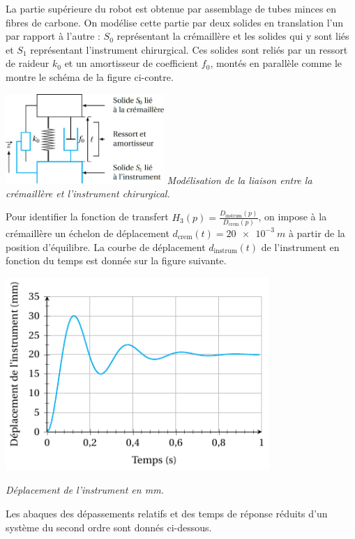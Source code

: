 \documentclass[10pt,fleqn]{article} %
\begin{document}
\noindent\begin{minipage}[c]{.6\linewidth}
La partie supérieure du robot est obtenue par assemblage de tubes minces en fibres de carbone. On modélise cette partie par deux solides en translation l'un par rapport à l'autre : $S_0$ représentant la crémaillère et les solides qui y sont liés et $S_1$ représentant l'instrument chirurgical. Ces solides sont reliés par un ressort de raideur $k_0$ et un amortisseur de coefficient $f_0$, montés en parallèle comme le montre le schéma de la figure ci-contre.%
\end{minipage}\hfill
\begin{minipage}[c]{.36\linewidth}
\begin{center}
	\includegraphics[width=6cm]{images2/schema_1}
\textit{Modélisation de la liaison entre la crémaillère et l'instrument chirurgical.\label{p04_robot_endo:fig6}}
\end{center}
\end{minipage}

Pour identifier la fonction de transfert $H_3(p)=\frac{D_{\text{instrum}}(p)}{D_{\text{crem}}(p)}$, on impose à la crémaillère un échelon de déplacement $d_{\text{crem}}(t) = \SI{20e-3}{m}$ à partir de la position d'équilibre. La courbe de déplacement $d_{\text{instrum}}(t)$ de l'instrument en fonction du temps est donnée sur la figure suivante.


\begin{center}%
	\includegraphics[width=10cm]{images2/identification_BF}

	\textit{Déplacement de l'instrument en mm.}
\end{center}
Les abaques des dépassements relatifs et des temps de réponse réduits d’un système du second ordre sont donnés ci-dessous.
\end{document}
